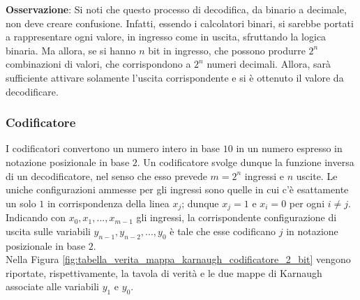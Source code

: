 \documentclass[a4paper]{extarticle}
\begin{document}
\noindent
\textbf{Osservazione}: Si noti che questo processo di decodifica, da binario a decimale, non deve creare confusione. Infatti, essendo i calcolatori binari, si sarebbe portati a rappresentare ogni valore, in ingresso come in uscita, sfruttando la logica binaria. Ma allora, se si hanno \(n\) bit in ingresso, che possono produrre \(2^n\) combinazioni di valori, che corrispondono a \(2^n\) numeri decimali. Allora, sarà sufficiente attivare solamente l'uscita corrispondente e si è ottenuto il valore da decodificare.

\vspace{1em}
\subsubsection{Codificatore}
I codificatori convertono un numero intero in base \(10\) in un numero espresso in notazione posizionale in base \(2\). Un codificatore svolge dunque la funzione inversa di un decodificatore, nel senso che esso prevede \(m = 2^n\) ingressi e \(n\) uscite. Le uniche configurazioni ammesse per gli ingressi sono quelle in cui c’è esattamente un solo \(1\) in corrispondenza della linea \(x_j\); dunque \(x_j = 1\) e \(x_i = 0\) per ogni \(i \neq j\). Indicando con \(x_0, x_1, ..., x_{m - 1}\) gli ingressi, la corrispondente configurazione di uscita sulle variabili \(y_{n - 1}, y_{n - 2}, ..., y_0\) è tale che esse codificano \(j\) in notazione posizionale in base \(2\).\\
Nella Figura \ref{fig:tabella_verita_mappa_karnaugh_codificatore_2_bit} vengono riportate, rispettivamente, la tavola di verità e le due mappe di Karnaugh associate alle variabili \(y_1\) e \(y_0\).
\end{document}
